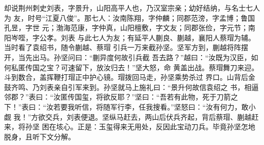 却说荆州刺史刘表，字景升，山阳高平人也，乃汉室宗亲；幼好结纳，与名士七人为
友，时号“江夏八俊”。那七人：汝南陈翔，字仲麟；同郡范滂，字孟博；鲁国孔昱，字世
元；渤海范康，字仲真，山阳檀敷，字文友；同郡张俭，字元节；南阳岑咥，字公孝。刘表
与此七人为友；有延平人蒯良、蒯越，襄阳人蔡瑁为辅。当时看了袁绍书，随令蒯越、蔡瑁
引兵一万来截孙坚。坚军方到，蒯越将阵摆开，当先出马。孙坚问曰：“蒯异度何故引兵截
吾去路？”越曰：“汝既为汉臣，如何私匿传国之宝？可速留下，放汝归去！”坚大怒，命
黄盖出战。蔡瑁舞刀来迎。斗到数合，盖挥鞭打瑁正中护心镜。瑁拨回马走，孙坚乘势杀过
界口。山背后金鼓齐鸣、乃刘表亲自引军来到。孙坚就马上施礼曰：“景升何故信袁绍之
书，相逼邻郡？”表曰：“汝匿传国玺，将欲反耶？”坚曰：“吾若有此物，死于刀箭之
下！”表曰：“汝若要我听信，将随军行李，任我搜看。”坚怒曰：“汝有何力，敢小觑
我！”方欲交兵，刘表便退。坚纵马赶去，两山后伏兵齐起，背后蔡瑁、蒯越赶来，将孙坚
困在垓心。正是：玉玺得来无用处，反因此宝动刀兵。毕竟孙坚怎地脱身，且听下文分解。